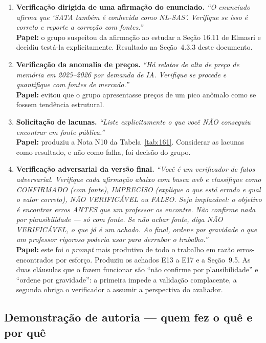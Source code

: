 \documentclass[11pt,a4paper]{article}
\begin{document}
\begin{enumerate}[label={\textbf{P\arabic*.}},leftmargin=*]
\item \textbf{Verificação dirigida de uma afirmação do enunciado.} \emph{``O enunciado
      afirma que `SATA também é conhecida como NL-SAS'. Verifique se isso é correto e
      reporte a correção com fontes.''}\\
      \textbf{Papel:} o grupo suspeitou da afirmação ao estudar a Seção 16.11 de Elmasri e
      decidiu testá-la explicitamente. Resultado na Seção~4.3.3 deste documento.

\item \textbf{Verificação da anomalia de preços.} \emph{``Há relatos de alta de preço de
      memória em 2025--2026 por demanda de IA. Verifique se procede e quantifique com fontes
      de mercado.''}\\
      \textbf{Papel:} evitou que o grupo apresentasse preços de um pico anômalo como se
      fossem tendência estrutural.

\item \textbf{Solicitação de lacunas.} \emph{``Liste explicitamente o que você NÃO
      conseguiu encontrar em fonte pública.''}\\
      \textbf{Papel:} produziu a Nota N10 da Tabela~\ref{tab:161}. Considerar as lacunas
      como resultado, e não como falha, foi decisão do grupo.

\item \textbf{Verificação adversarial da versão final.} \emph{``Você é um verificador de
      fatos adversarial. Verifique cada afirmação abaixo com busca web e classifique como
      CONFIRMADO (com fonte), IMPRECISO (explique o que está errado e qual o valor correto),
      NÃO VERIFICÁVEL ou FALSO. Seja implacável: o objetivo é encontrar erros ANTES que um
      professor os encontre. Não confirme nada por plausibilidade --- só com fonte. Se não
      achar fonte, diga NÃO VERIFICÁVEL, o que já é um achado. Ao final, ordene por gravidade
      o que um professor rigoroso poderia usar para derrubar o trabalho.''}\\
      \textbf{Papel:} este foi o \emph{prompt} mais produtivo de todo o trabalho em razão
      erros-encontrados por esforço. Produziu os achados E13 a E17 e a Seção~9.5. As duas
      cláusulas que o fazem funcionar são ``não confirme por plausibilidade'' e ``ordene por
      gravidade'': a primeira impede a validação complacente, a segunda obriga o verificador
      a assumir a perspectiva do avaliador.
\end{enumerate}

\subsection{Demonstração de autoria --- quem fez o quê e por quê}
\end{document}

